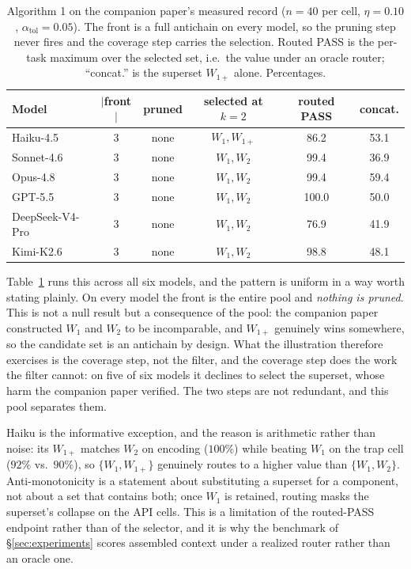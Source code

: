 \documentclass[11pt]{article}
\theoremstyle{plain}
\theoremstyle{definition}
\theoremstyle{remark}
\begin{document}
\begin{table}[t]
\centering
\small
\begin{tabular}{@{}lccccc@{}}
\toprule
Model & $|$front$|$ & pruned & selected at $k{=}2$ & routed PASS & concat. \\
\midrule
Haiku-4.5       & 3 & none & $W_1, W_{1+}$ & 86.2 & 53.1 \\
Sonnet-4.6      & 3 & none & $W_1, W_2$    & 99.4 & 36.9 \\
Opus-4.8        & 3 & none & $W_1, W_2$    & 99.4 & 59.4 \\
GPT-5.5         & 3 & none & $W_1, W_2$    & 100.0 & 50.0 \\
DeepSeek-V4-Pro & 3 & none & $W_1, W_2$    & 76.9 & 41.9 \\
Kimi-K2.6       & 3 & none & $W_1, W_2$    & 98.8 & 48.1 \\
\bottomrule
\end{tabular}
\caption{Algorithm 1 on the companion paper's measured record ($n=40$ per cell, $\eta=0.10$,
$\alpha_{\mathrm{tol}}=0.05$). The front is a full antichain on every model, so the pruning step
never fires and the coverage step carries the selection. Routed PASS is the per-task maximum over
the selected set, i.e.\ the value under an oracle router; ``concat.'' is the superset $W_{1+}$
alone. Percentages.}
\label{tab:illustration}
\end{table}

Table~\ref{tab:illustration} runs this across all six models, and the pattern is uniform in a way
worth stating plainly. On every model the front is the entire pool and \emph{nothing is pruned}.
This is not a null result but a consequence of the pool: the companion paper constructed $W_1$ and
$W_2$ to be incomparable, and $W_{1+}$ genuinely wins somewhere, so the candidate set is an
antichain by design. What the illustration therefore exercises is the coverage step, not the
filter, and the coverage step does the work the filter cannot: on five of six models it declines to
select the superset, whose harm the companion paper verified. The two steps are not redundant, and
this pool separates them.

Haiku is the informative exception, and the reason is arithmetic rather than noise: its $W_{1+}$
matches $W_2$ on encoding ($100\%$) while beating $W_1$ on the trap cell ($92\%$ vs.\ $90\%$), so
$\{W_1, W_{1+}\}$ genuinely routes to a higher value than $\{W_1, W_2\}$. Anti-monotonicity is a
statement about substituting a superset for a component, not about a set that contains both; once
$W_1$ is retained, routing masks the superset's collapse on the API cells. This is a limitation of
the routed-PASS endpoint rather than of the selector, and it is why the benchmark of
\S\ref{sec:experiments} scores assembled context under a realized router rather than an oracle one.
\end{document}
